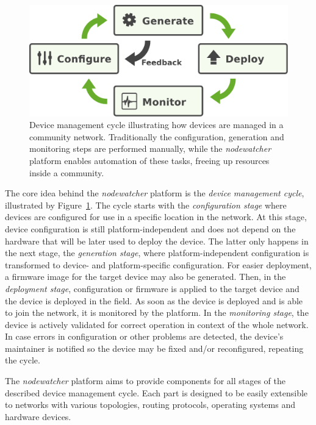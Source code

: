 \documentclass[5p,sort&compress]{elsarticle}
\newcommand{\nodewatcher}{\textit{nodewatcher}}
\begin{document}
\begin{figure}
  \centering
  \includegraphics[scale=0.4]{figures/device-mgmt-cycle.pdf}
  \caption{Device management cycle illustrating how devices are managed in a community network.
Traditionally the configuration, generation and monitoring steps are performed manually, while the \nodewatcher{} platform enables automation of these tasks, freeing up resources inside a community.}
  \label{fig:device-mgmt-cycle}
\end{figure}

The core idea behind the \nodewatcher{} platform is the \textit{device management cycle}, illustrated by Figure~\ref{fig:device-mgmt-cycle}.
The cycle starts with the \textit{configuration stage} where devices are configured for use in a specific location in the network.
At this stage, device configuration is still platform-independent and does not depend on the hardware that will be later used to deploy the device.
The latter only happens in the next stage, the \textit{generation stage}, where platform-independent configuration is transformed to device- and platform-specific configuration.
For easier deployment, a firmware image for the target device may also be generated.
Then, in the \textit{deployment stage}, configuration or firmware is applied to the target device and the device is deployed in the field.
As soon as the device is deployed and is able to join the network, it is monitored by the platform.
In the \textit{monitoring stage}, the device is actively validated for correct operation in context of the whole network.
In case errors in configuration or other problems are detected, the device's maintainer is notified so the device may be fixed and/or reconfigured, repeating the cycle.

The \nodewatcher{} platform aims to provide components for all stages of the described device management cycle.
Each part is designed to be easily extensible to networks with various topologies, routing protocols, operating systems and hardware devices.
\end{document}
